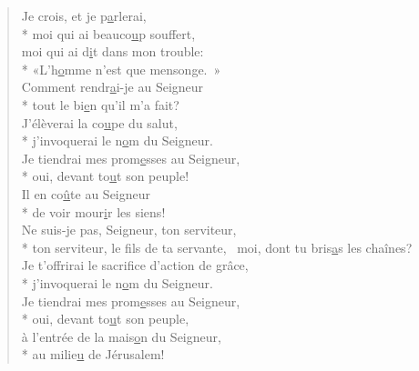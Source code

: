 \begin{verse}
Je crois, et je p\underline{a}rlerai, \\*
moi qui ai beauco\underline{u}p souffert, \\
moi qui ai d\underline{i}t dans mon trouble: \\*
«L’h\underline{o}mme n’est que mensonge. » \\

Comment rendr\underline{a}i-je au Seigneur \\*
tout le bi\underline{e}n qu’il m’a fait? \\
J’élèverai la co\underline{u}pe du salut, \\*
j’invoquerai le n\underline{o}m du Seigneur. \\
Je tiendrai mes prom\underline{e}sses au Seigneur, \\*
oui, devant to\underline{u}t son peuple! \\

Il en co\underline{û}te au Seigneur \\*
de voir mour\underline{i}r les siens! \\
Ne suis-je pas, Seigneur, ton serviteur, \\*
ton serviteur, le f\underline{i}ls de ta servante,~\psalmstar
moi, dont tu bris\underline{a}s les chaînes? \\

Je t’offrirai le sacrif\underline{i}ce d’action de grâce, \\*
j’invoquerai le n\underline{o}m du Seigneur. \\
Je tiendrai mes prom\underline{e}sses au Seigneur, \\*
oui, devant to\underline{u}t son peuple, \\
à l’entrée de la mais\underline{o}n du Seigneur, \\*
au milie\underline{u} de Jérusalem! \\
\end{verse}


